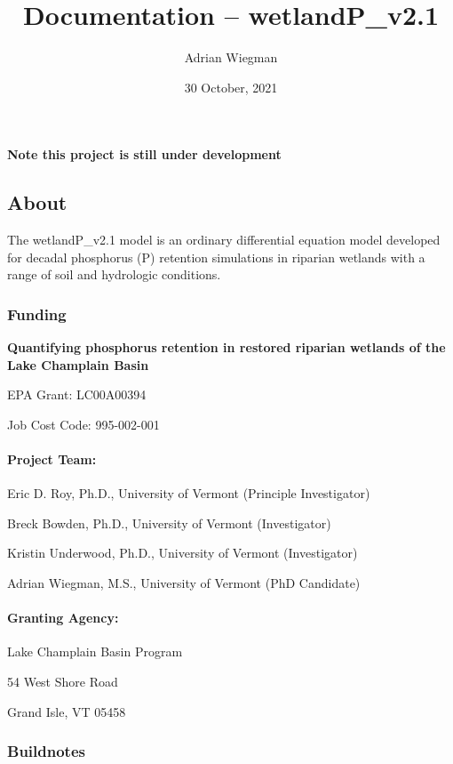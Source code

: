 \documentclass[
]{article}
\title{Documentation -- wetlandP\_v2.1}
\author{Adrian Wiegman}
\date{30 October, 2021}
\begin{document}
\maketitle

{
\setcounter{tocdepth}{2}
\tableofcontents
}
\textbf{Note this project is still under development}

\hypertarget{about}{%
\subsection{About}\label{about}}

The wetlandP\_v2.1 model is an ordinary differential equation model
developed for decadal phosphorus (P) retention simulations in riparian
wetlands with a range of soil and hydrologic conditions.

\hypertarget{funding}{%
\subsubsection{Funding}\label{funding}}

\textbf{Quantifying phosphorus retention in restored riparian wetlands
of the Lake Champlain Basin}

EPA Grant: LC00A00394

Job Cost Code: 995-002-001

\hypertarget{project-team}{%
\paragraph{Project Team:}\label{project-team}}

Eric D. Roy, Ph.D., University of Vermont (Principle Investigator)

Breck Bowden, Ph.D., University of Vermont (Investigator)

Kristin Underwood, Ph.D., University of Vermont (Investigator)

Adrian Wiegman, M.S., University of Vermont (PhD Candidate)

\hypertarget{granting-agency}{%
\paragraph{Granting Agency:}\label{granting-agency}}

Lake Champlain Basin Program

54 West Shore Road

Grand Isle, VT 05458

\hypertarget{buildnotes}{%
\subsubsection{Buildnotes}\label{buildnotes}}
\end{document}
